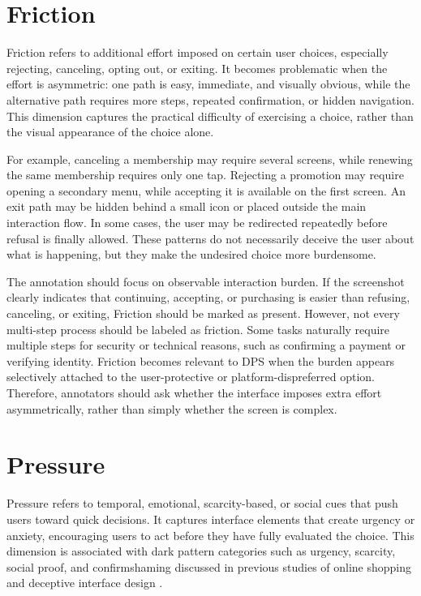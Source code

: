 \section{Friction}

Friction refers to additional effort imposed on certain user choices, especially rejecting, canceling, opting out, or exiting. It becomes problematic when the effort is asymmetric: one path is easy, immediate, and visually obvious, while the alternative path requires more steps, repeated confirmation, or hidden navigation. This dimension captures the practical difficulty of exercising a choice, rather than the visual appearance of the choice alone.

For example, canceling a membership may require several screens, while renewing the same membership requires only one tap. Rejecting a promotion may require opening a secondary menu, while accepting it is available on the first screen. An exit path may be hidden behind a small icon or placed outside the main interaction flow. In some cases, the user may be redirected repeatedly before refusal is finally allowed. These patterns do not necessarily deceive the user about what is happening, but they make the undesired choice more burdensome.

The annotation should focus on observable interaction burden. If the screenshot clearly indicates that continuing, accepting, or purchasing is easier than refusing, canceling, or exiting, Friction should be marked as present. However, not every multi-step process should be labeled as friction. Some tasks naturally require multiple steps for security or technical reasons, such as confirming a payment or verifying identity. Friction becomes relevant to DPS when the burden appears selectively attached to the user-protective or platform-dispreferred option. Therefore, annotators should ask whether the interface imposes extra effort asymmetrically, rather than simply whether the screen is complex.

\section{Pressure}

Pressure refers to temporal, emotional, scarcity-based, or social cues that push users toward quick decisions. It captures interface elements that create urgency or anxiety, encouraging users to act before they have fully evaluated the choice. This dimension is associated with dark pattern categories such as urgency, scarcity, social proof, and confirmshaming discussed in previous studies of online shopping and deceptive interface design \cite{mathur2019darkpatterns}.

